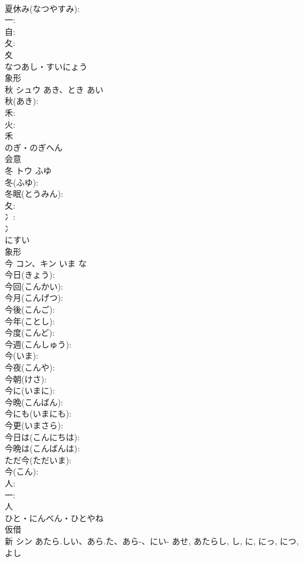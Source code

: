 \documentclass[8pt]{extreport}
\begin{document}
\begin{CJK}{UTF8}{min}
\\	夏休み(なつやすみ): 
\\	一: 
\\	自: 
\\	夂: 
\\	夊	
\\	なつあし・すいにょう	
\\	象形 
\\	秋	シュウ	あき、とき	あい	
\\	秋(あき): 
\\	禾: 
\\	火: 
\\	禾	
\\	のぎ・のぎへん	
\\	会意 
\\	冬	トウ	ふゆ		
\\	冬(ふゆ): 
\\	冬眠(とうみん): 
\\	夂: 
\\	冫: 
\\	冫	
\\	にすい	
\\	象形 
\\	今	コン、キン	いま	な	
\\	今日(きょう): 
\\	今回(こんかい): 
\\	今月(こんげつ): 
\\	今後(こんご): 
\\	今年(ことし): 
\\	今度(こんど): 
\\	今週(こんしゅう): 
\\	今(いま): 
\\	今夜(こんや): 
\\	今朝(けさ): 
\\	今に(いまに): 
\\	今晩(こんばん): 
\\	今にも(いまにも): 
\\	今更(いまさら): 
\\	今日は(こんにちは): 
\\	今晩は(こんばんは): 
\\	ただ今(ただいま): 
\\	今(こん): 
\\	人: 
\\	一: 
\\	人	
\\	ひと・にんべん・ひとやね	
\\	仮借 
\\	新	シン	あたら.しい、あら.た、あら-、にい-	あせ, あたらし, し, に, にっ, につ, よし	

\end{CJK}
\end{document}
